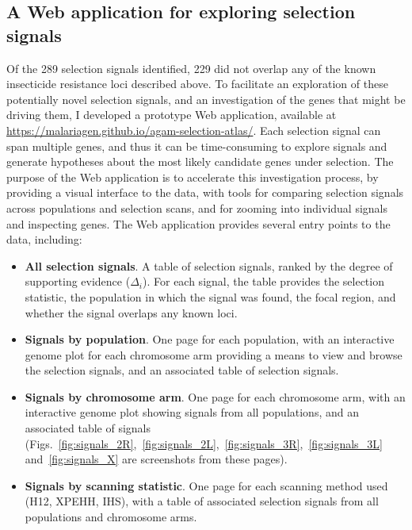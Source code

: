 \begin{refsection}
\subsection{A Web application for exploring selection signals}\label{subsec:webapp}


Of the 289 selection signals identified, 229 did not overlap any of the known insecticide resistance loci described above.
%
To facilitate an exploration of these potentially novel selection signals, and an investigation of the genes that might be driving them, I developed a prototype Web application, available at \url{https://malariagen.github.io/agam-selection-atlas/}.
%
Each selection signal can span multiple genes, and thus it can be time-consuming to explore signals and generate hypotheses about the most likely candidate genes under selection.
%
The purpose of the Web application is to accelerate this investigation process, by providing a visual interface to the data, with tools for comparing selection signals across populations and selection scans, and for zooming into individual signals and inspecting genes.
%
The Web application provides several entry points to the data, including:
%
\begin{itemize}
    \item \textbf{All selection signals}.
    A table of selection signals, ranked by the degree of supporting evidence ($\Delta_i$).
    For each signal, the table provides the selection statistic, the population in which the signal was found, the focal region, and whether the signal overlaps any known loci.
    \item \textbf{Signals by population}.
    One page for each population, with an interactive genome plot for each chromosome arm providing a means to view and browse the selection signals, and an associated table of selection signals.
    \item \textbf{Signals by chromosome arm}.
    One page for each chromosome arm, with an interactive genome plot showing signals from all populations, and an associated table of signals (Figs.~\ref{fig:signals_2R},~\ref{fig:signals_2L},~\ref{fig:signals_3R},~\ref{fig:signals_3L} and~\ref{fig:signals_X} are screenshots from these pages).
    \item \textbf{Signals by scanning statistic}.
    One page for each scanning method used (H12, XPEHH, IHS), with a table of associated selection signals from all populations and chromosome arms.

\end{itemize}
\end{refsection}
